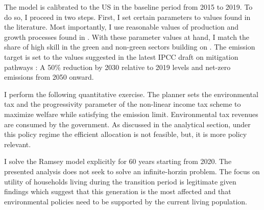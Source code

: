 The model is calibrated to the US in the baseline period from 2015 to 2019. To do so, I proceed in two steps. First, I set certain parameters to values found in the literature. Most importantly, I use reasonable values of production and growth processes found in \cite{Fried2018ClimateAnalysis}. %
With these parameter values at hand, I match the share of high skill in the green and non-green sectors building on \cite{Consoli2016DoCapital}. The emission target is set to the values suggested in the latest IPCC draft on mitigation pathways \citep{IPCC2022}: A 50\% reduction by 2030 relative to 2019 levels and  net-zero emissions from 2050 onward.

I perform the following quantitative exercise. 
 The planner sets the environmental tax and the progressivity parameter of the non-linear income tax scheme to maximize welfare while satisfying the emission limit. Environmental tax revenues are consumed by the government. As discussed in the analytical section, under this policy regime the efficient allocation is not feasible, but, it is  more policy relevant. 

I solve the Ramsey model explicitly for 60 years starting from 2020. The presented analysis does not seek to solve an infinite-horzin problem. The focus on utility of households living during the transition period is legitimate given findings which suggest that this generation is the most affected  and that environmental policies need to be supported by the current living population. 

